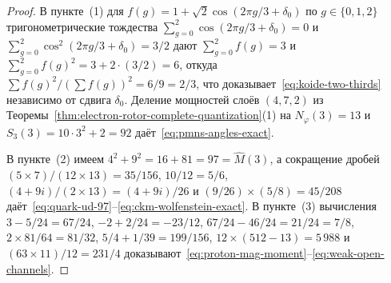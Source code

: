 \documentclass[11pt,a4paper]{article}
\theoremstyle{plain}
\theoremstyle{definition}
\begin{document}
\begin{proof}
В пункте~(1) для $f(g) = 1 + \sqrt{2}\cos(2\pi g/3 + \delta_0)$ по $g \in \{0, 1, 2\}$ тригонометрические тождества $\sum_{g=0}^2 \cos(2\pi g/3 + \delta_0) = 0$ и $\sum_{g=0}^2 \cos^2(2\pi g/3 + \delta_0) = 3/2$ дают $\sum_{g=0}^2 f(g) = 3$ и $\sum_{g=0}^2 f(g)^2 = 3 + 2\cdot(3/2) = 6$, откуда $\sum f(g)^2 / (\sum f(g))^2 = 6 / 9 = 2/3$, что доказывает~\eqref{eq:koide-two-thirds} независимо от сдвига $\delta_0$. Деление мощностей слоёв $(4, 7, 2)$ из Теоремы~\ref{thm:electron-rotor-complete-quantization}(1) на $N_\varphi(3) = 13$ и $S_3(3) = 10\cdot 3^2 + 2 = 92$ даёт~\eqref{eq:pmns-angles-exact}.

В пункте~(2) имеем $4^2 + 9^2 = 16 + 81 = 97 = \widehat{M}(3)$, а сокращение дробей $(5\times 7)/(12\times 13) = 35/156$, $10/12 = 5/6$, $(4 + 9i)/(2\times 13) = (4+9i)/26$ и $(9/26)\times(5/8) = 45/208$ даёт~\eqref{eq:quark-ud-97}--\eqref{eq:ckm-wolfenstein-exact}. В пункте~(3) вычисления $3 - 5/24 = 67/24$, $-2 + 2/24 = -23/12$, $67/24 - 46/24 = 21/24 = 7/8$, $2\times 81/64 = 81/32$, $5/4 + 1/39 = 199/156$, $12\times(512 - 13) = 5\,988$ и $(63\times 11)/12 = 231/4$ доказывают~\eqref{eq:proton-mag-moment}--\eqref{eq:weak-open-channels}.
\end{proof}
\end{document}
